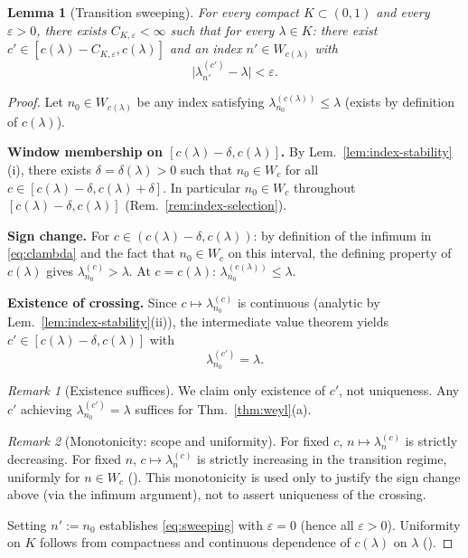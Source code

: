 \documentclass[12pt,a4paper]{amsart}
\newtheorem{lemma}[theorem]{Lemma}
\theoremstyle{definition}
\theoremstyle{remark}
\newtheorem*{remark*}{Remark}
\begin{document}
\begin{lemma}[Transition sweeping]
\label{lem:sweeping}
For every compact $K\subset(0,1)$
and every $\varepsilon>0$,
there exists $C_{K,\varepsilon}<\infty$ such that
for every $\lambda\in K$:
there exist $c'\in[c(\lambda)-C_{K,\varepsilon},
c(\lambda)]$ and an index
$n'\in W_{c(\lambda)}$ with
\begin{equation}\label{eq:sweeping}
  \bigl|\lambda_{n'}^{(c')} - \lambda\bigr|
  < \varepsilon.
\end{equation}
\end{lemma}
\begin{proof}
Let $n_0\in W_{c(\lambda)}$ be any index
satisfying $\lambda_{n_0}^{(c(\lambda))}\le\lambda$
(exists by definition of $c(\lambda)$).

\textbf{Window membership on $[c(\lambda)-\delta, c(\lambda)]$.}
By Lem.~\ref{lem:index-stability}(i),
there exists $\delta=\delta(\lambda)>0$ such that
$n_0\in W_c$ for all
$c\in[c(\lambda)-\delta, c(\lambda)+\delta]$.
In particular $n_0\in W_c$ throughout
$[c(\lambda)-\delta, c(\lambda)]$
(Rem.~\ref{rem:index-selection}).

\textbf{Sign change.}
For $c\in(c(\lambda)-\delta, c(\lambda))$:
by definition of the infimum in
\eqref{eq:clambda} and the fact that
$n_0\in W_c$ on this interval,
the defining property of $c(\lambda)$ gives
$\lambda_{n_0}^{(c)}>\lambda$.
At $c=c(\lambda)$:
$\lambda_{n_0}^{(c(\lambda))}\le\lambda$.

\textbf{Existence of crossing.}
Since $c\mapsto\lambda_{n_0}^{(c)}$ is
continuous (analytic by
Lem.~\ref{lem:index-stability}(ii)),
the intermediate value theorem yields
$c'\in[c(\lambda)-\delta, c(\lambda)]$ with
\[
  \lambda_{n_0}^{(c')} = \lambda.
\]

\begin{remark*}[Existence suffices]
We claim only existence of $c'$, not uniqueness.
Any $c'$ achieving $\lambda_{n_0}^{(c')}=\lambda$
suffices for Thm.~\ref{thm:weyl}(a).
\end{remark*}

\begin{remark*}[Monotonicity: scope and uniformity]
For fixed $c$, $n\mapsto\lambda_n^{(c)}$
is strictly decreasing.
For fixed $n$, $c\mapsto\lambda_n^{(c)}$ is
strictly increasing in the transition regime,
uniformly for $n\in W_c$
(\cite[Ch.~3]{Osipov2013}).
This monotonicity is used only to justify the
sign change above (via the infimum argument),
not to assert uniqueness of the crossing.
\end{remark*}

Setting $n':=n_0$ establishes \eqref{eq:sweeping}
with $\varepsilon=0$ (hence all $\varepsilon>0$).
Uniformity on $K$ follows from compactness
and continuous dependence of $c(\lambda)$
on $\lambda$ (\cite{Widom1964,Osipov2013}).
\end{proof}
\end{document}
